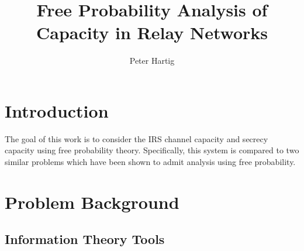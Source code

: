 \documentclass[12pt,a4paper]{report}
\title{Free Probability Analysis of Capacity in Relay Networks}
\author{Peter Hartig}
\begin{document}
\maketitle
\tableofcontents
\chapter{Introduction}
The goal of this work is to consider the IRS channel capacity and secrecy capacity using free probability theory. Specifically, this system is compared to two similar problems which have been shown to admit analysis using free probability. 
\par

\chapter{Problem Background}

\section{Information Theory Tools}
\end{document}
